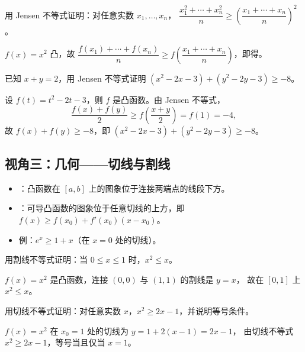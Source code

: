 \begin{explore}
\begin{problem}
用 Jensen 不等式证明：对任意实数 $x_1,\dots,x_n$，
$\dfrac{x_1^2+\cdots+x_n^2}{n}\geq\left(\dfrac{x_1+\cdots+x_n}{n}\right)^2$。
\end{problem}
\begin{solution}
$f(x)=x^2$ 凸，故 $\dfrac{f(x_1)+\cdots+f(x_n)}{n}\geq f\left(\dfrac{x_1+\cdots+x_n}{n}\right)$，即得。
\end{solution}

\begin{problem}
已知 $x+y=2$，用 Jensen 不等式证明 $(x^2-2x-3)+(y^2-2y-3)\geq-8$。
\end{problem}
\begin{solution}
设 $f(t)=t^2-2t-3$，则 $f$ 是凸函数。由 Jensen 不等式，
\[
  \frac{f(x)+f(y)}{2}\geq f\left(\frac{x+y}{2}\right)=f(1)=-4,
\]
故 $f(x)+f(y)\geq-8$，即 $(x^2-2x-3)+(y^2-2y-3)\geq-8$。
\end{solution}

\subsection{视角三：几何——切线与割线}

\begin{itemize}
  \item {}：凸函数在 $[a,b]$ 上的图象位于连接两端点的线段下方。
  \item {}：可导凸函数的图象位于任意切线的上方，即 $f(x)\geq f(x_0)+f'(x_0)(x-x_0)$。
  \item 例：$e^x\geq1+x$（在 $x=0$ 处的切线）。
\end{itemize}

\begin{example}
用割线不等式证明：当 $0\leq x\leq1$ 时，$x^2\leq x$。
\end{example}
\begin{solution}
$f(x)=x^2$ 是凸函数，连接 $(0,0)$ 与 $(1,1)$ 的割线是 $y=x$，
故在 $[0,1]$ 上 $x^2\leq x$。
\end{solution}

\begin{problem}
用切线不等式证明：对任意实数 $x$，$x^2\geq2x-1$，并说明等号条件。
\end{problem}
\begin{solution}
$f(x)=x^2$ 在 $x_0=1$ 处的切线为 $y=1+2(x-1)=2x-1$，
由切线不等式 $x^2\geq2x-1$，等号当且仅当 $x=1$。
\end{solution}


\end{explore}
